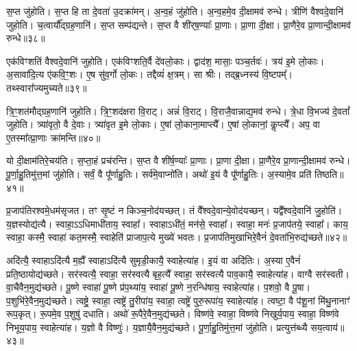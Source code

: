 स॒प्त जु॑होति।
स॒प्त हि ता दे॒वता॑ उ॒दक्रा॑मन्।
अ॒न्व॒हं जु॑होति।
अ॒न्व॒हमे॒व दी॒क्षामव॑ रुन्धे।
त्रीणि॑ वैश्वदे॒वानि॑ जुहोति।
च॒त्वार्यौ᳚द्ग्रह॒णानि॑।
स॒प्त सम्प॑द्यन्ते।
स॒प्त वै शी॑र्‌\mbox{}ष॒ण्याः᳚ प्रा॒णाः।
प्रा॒णा दी॒क्षा।
प्रा॒णैरे॒व प्रा॒णान्दी॒क्षामव॑ रुन्धे॥३८॥

एक॑विꣳशतिं वैश्वदे॒वानि॑ जुहोति।
एक॑विꣳशति॒र्वै दे॑वलो॒काः।
द्वाद॑श॒ मासाः॒ पञ्च॒र्तवः॑।
त्रय॑ इ॒मे लो॒काः।
अ॒सावा॑दि॒त्य ए॑कवि॒ꣳ॒शः।
ए॒ष सु॑व॒र्गो लो॒कः।
तद्दैव्यं॑ क्ष॒त्रम्।
सा श्रीः।
तद्ब्र॒ध्नस्य॑ वि॒ष्टपम्᳚।
तथ्स्वारा᳚ज्यमुच्यते॥३९॥

त्रि॒ꣳ॒शत॑मौद्ग्रह॒णानि॑ जुहोति।
त्रि॒ꣳ॒शद॑क्षरा वि॒राट्।
अन्नं॑ वि॒राट्।
वि॒राजै॒वान्नाद्य॒मव॑ रुन्धे।
त्रे॒धा वि॒भज्य॑ दे॒वतां᳚ जुहोति।
त्र्या॑वृतो॒ वै दे॒वाः।
त्र्या॑वृत इ॒मे लो॒काः।
ए॒षां लो॒काना॒माप्त्यै᳚।
ए॒षां लो॒कानां॒ कॢप्त्यै᳚।
अप॒ वा ए॒तस्मा᳚त्प्रा॒णाः क्रा॑मन्ति॥४०॥

यो दी॒क्षाम॑तिरे॒चय॑ति।
स॒प्ता॒हं प्रच॑रन्ति।
स॒प्त वै शी॑र्\mbox{}ष॒ण्याः᳚ प्रा॒णाः।
प्रा॒णा दी॒क्षा।
प्रा॒णैरे॒व प्रा॒णान्दी॒क्षामव॑ रुन्धे।
पू॒र्णा॒हु॒तिमु॑त्त॒मां जु॑होति।
सर्वं॒ वै पू᳚र्णाहु॒तिः।
सर्व॑\-मे॒वा\-प्नो॑ति।
अथो॑ इ॒यं वै पू᳚र्णाहु॒तिः।
अ॒स्यामे॒व प्रति॑ तिष्ठति॥४१॥\anuvakamend[रु॒न्धे॒ प्रा॒णान्दी॒क्षामव॑ रुन्ध उच्यते क्रामन्ति तिष्ठति]

प्र॒जा\-प॑तिरश्वमे॒धम॑\-सृजत।
तꣳ सृ॒ष्टं न किञ्च॒नोद॑यच्छत्।
तं वै᳚श्वदे॒वान्ये॒वोद॑यच्छन्।
यद्वै᳚श्वदे॒वानि॑ जु॒होति॑।
य॒ज्ञस्योद्य॑त्यै।
स्वाहा॒\-ऽऽधिमाधी॑ताय॒ स्वाहा᳚।
स्वाहा\-ऽधी॑तं॒ मन॑से॒ स्वाहा᳚।
स्वाहा॒ मनः॑ प्र॒जा\-प॑तये॒ स्वाहा᳚।
काय॒ स्वाहा॒ कस्मै॒ स्वाहा॑ कत॒मस्मै॒ स्वाहेति॑ प्राजाप॒त्ये मुख्ये॑ भवतः।
प्र॒जा\-प॑तिमुखाभिरे॒वैनं॑ दे॒वता॑भि॒रुद्य॑च्छते॥४२॥

अदि॑त्यै॒ स्वाहा\-ऽदि॑त्यै म॒ह्यै᳚ स्वाहा\-ऽदि॑त्यै सुमृडी॒कायै॒ स्वाहेत्या॑ह।
इ॒यं वा अदि॑तिः।
अ॒स्या ए॒वैनं॑ प्रति॒ष्ठायोद्य॑च्छते।
सर॑स्वत्यै॒ स्वाहा॒ सर॑स्वत्यै बृह॒त्यै᳚ स्वाहा॒ सर॑स्वत्यै पाव॒कायै॒ स्वाहेत्या॑ह।
वाग्वै सर॑स्वती।
वा॒चैवैन॒मुद्य॑च्छते।
पू॒ष्णे स्वाहा॑ पू॒ष्णे प्र॑प॒थ्या॑य॒ स्वाहा॑ पू॒ष्णे न॒रन्धि॑षाय॒ स्वाहेत्या॑ह।
प॒शवो॒ वै पू॒षा।
प॒शुभि॑रे॒वैन॒मुद्य॑च्छते।
त्वष्ट्रे॒ स्वाहा॒ त्वष्ट्रे॑ तु॒रीपा॑य॒ स्वाहा॒ त्वष्ट्रे॑ पुरु॒रूपा॑य॒ स्वाहेत्या॑ह।
त्वष्टा॒ वै प॑शू॒नां मि॑थु॒नानाꣳ॑ रूप॒कृत्।
रू॒पमे॒व प॒शुषु॑ दधाति।
अथो॑ रू॒पैरे॒वैन॒मुद्य॑च्छते।
विष्ण॑वे॒ स्वाहा॒ विष्ण॑वे निखुर्य॒पाय॒ स्वाहा॒ विष्ण॑वे निभूय॒पाय॒ स्वाहेत्या॑ह।
य॒ज्ञो वै विष्णुः॑।
य॒ज्ञायै॒वैन॒मुद्य॑च्छते।
पू॒र्णा॒हु॒तिमु॑त्त॒मां जु॑होति।
प्रत्युत्त॑ब्ध्यै सय॒त्वाय॑॥४३॥\anuvakamend[य॒च्छ॒ते॒ पु॒रु॒रूपा॑य॒ स्वाहेत्या॑हा॒ष्टौ च॑]

